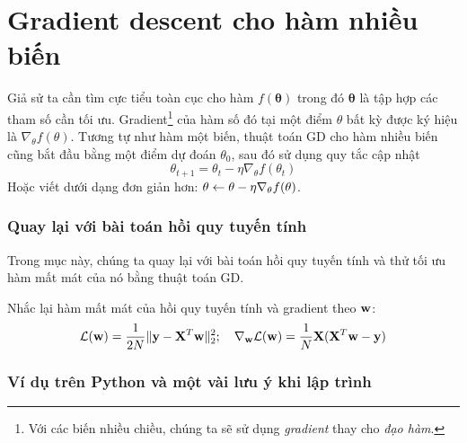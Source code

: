 \section{Gradient descent cho hàm nhiều biến}
Giả sử ta cần tìm cực tiểu toàn cục cho hàm $f(\mathbf{\theta})$ trong đó
$\mathbf{\theta}$ là tập hợp các tham số cần tối ưu. Gradient\footnote{Với các
biến nhiều chiều, chúng ta sẽ sử dụng \textit{gradient} thay cho \textit{đạo
hàm}.} của hàm số đó tại một điểm $\theta$ bất kỳ được ký hiệu là
$\nabla_{\theta}f(\theta)$. Tương tự như hàm một biến, thuật toán GD cho hàm
nhiều biến cũng bắt đầu bằng một điểm dự đoán $\theta_{0}$, sau đó sử dụng quy
tắc cập nhật
\begin{equation}
\boxed{
\theta_{t+1} = \theta_{t} - \eta \nabla_{\theta} f(\theta_{t})
}
\end{equation}
Hoặc viết dưới dạng đơn giản hơn: $\theta \leftarrow \theta - \eta \nabla_{\theta}
f(\theta)$.



\subsubsection{Quay lại với bài toán hồi quy tuyến tính}

Trong mục này, chúng ta quay lại với bài toán hồi quy tuyến tính và thử tối ưu
hàm mất mát của nó bằng thuật toán GD.

Nhắc lại hàm mất mát của hồi quy tuyến tính và gradient theo $\mathbf{w}$:
\begin{equation}
\mathcal{L}(\mathbf{w}) = \frac{1}{2N}\|\mathbf{y} - \mathbf{X}^T\mathbf{w}\|_2^2; \quad \nabla_{\mathbf{w}}\mathcal{L}(\mathbf{w}) =
\frac{1}{N}\mathbf{X}(\mathbf{X}^T\mathbf{w} - \mathbf{y})
\end{equation}


\subsubsection{Ví dụ trên Python và một vài lưu ý khi lập trình}




